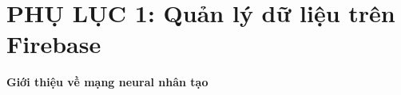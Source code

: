 \let\svaddcontentsline\addcontentsline
\renewcommand\addcontentsline[3]{%
  \ifthenelse{\equal{#1}{lof}}{}%
  {\ifthenelse{\equal{#1}{lot}}{}{\svaddcontentsline{#1}{#2}{#3}}}}

\chapter{PHỤ LỤC 1: Quản lý dữ liệu trên Firebase}
\textbf{Giới thiệu về mạng neural nhân tạo }
